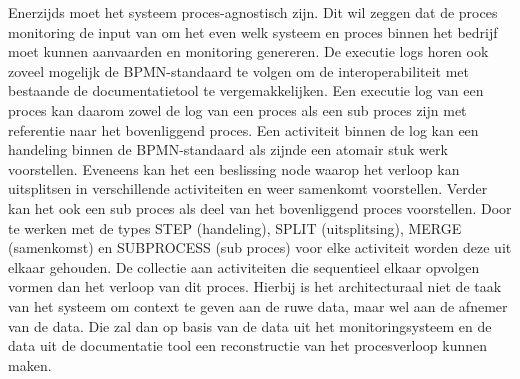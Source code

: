 Enerzijds moet het systeem proces-agnostisch zijn. Dit wil zeggen dat de proces monitoring de input van om het even welk systeem en proces binnen het bedrijf moet kunnen aanvaarden en monitoring genereren. De executie logs horen ook zoveel mogelijk de BPMN-standaard te volgen om de interoperabiliteit met bestaande de documentatietool te vergemakkelijken. Een executie log van een proces kan daarom zowel de log van een proces als een sub proces zijn met referentie naar het bovenliggend proces. Een activiteit binnen de log kan een handeling binnen de BPMN-standaard als zijnde een atomair stuk werk voorstellen. Eveneens kan het een beslissing node waarop het verloop kan uitsplitsen in verschillende activiteiten en weer samenkomt voorstellen. Verder kan het ook een sub proces als deel van het bovenliggend proces voorstellen. Door te werken met de types STEP (handeling), SPLIT (uitsplitsing), MERGE (samenkomst) en SUBPROCESS (sub proces) voor elke activiteit worden deze uit elkaar gehouden. De collectie aan activiteiten die sequentieel elkaar opvolgen vormen dan het verloop van dit proces. Hierbij is het architecturaal niet de taak van het systeem om context te geven aan de ruwe data, maar wel aan de afnemer van de data. Die zal dan op basis van de data uit het monitoringsysteem en de data uit de documentatie tool een reconstructie van het procesverloop kunnen maken. \newline

